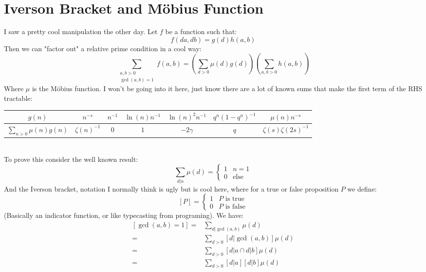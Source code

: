 
\section{Iverson Bracket and Möbius Function}
I saw a pretty cool manipulation the other day.
Let $f$ be a function such that:
\[f(da,db) = g(d)h(a,b)\]
Then we can "factor out" a relative prime condition in a cool way:
\[\sum_{\substack{a,b > 0\\ \gcd(a,b) = 1}}f(a,b) = \left(\sum_{d>0}\mu(d)g(d)\right)\left(\sum_{a,b>0}h(a,b)\right)\]
Where $\mu$ is the Möbius function.
I won't be going into it here,
just know there are a lot of known sums that make the first term of the RHS tractable:
\\

\begin{tabular}{|c|c|c|c|c|c|c|}
\hline
	$g(n)$&$n^{-s}$&$n^{-1}$&$\ln(n)n^{-1}$&$\ln(n)^2n^{-1}$&$q^n(1-q^n)^{-1}$&$\mu(n)n^{-s}$\\
	\hline
	$\sum_{n>0}\mu(n)g(n)$&$\zeta(n)^{-1}$&$0$&$1$&$-2\gamma$&$q$&$\zeta(s)\zeta(2s)^{-1}$\\
	\hline
\end{tabular}
\\

To prove this consider the well known result:
\[\sum_{d|n}\mu(d) = \begin{cases} 1&n=1\\ 0&\text{else} \end{cases}\]
And the Iverson bracket,
notation I normally think is ugly but is cool here,
where for a true or false proposition $P$ we define:
\[[P] = \begin{cases} 1 & P \text{ is true} \\ 0 & P \text{ is false} \end{cases}\]
(Basically an indicator function, or like typecasting from programing).
We have:
\begin{equation*}
\begin{aligned}
[\gcd(a,b)=1] =&
\sum_{d|\gcd(a,b)}\mu(d)\\
=&\sum_{d>0}[d|\gcd(a,b)]\mu(d)\\
=&\sum_{d>0}[d|a \cap d|b]\mu(d)\\
=&\sum_{d>0}[d|a][ d|b]\mu(d)\\
\end{aligned}
\end{equation*}

